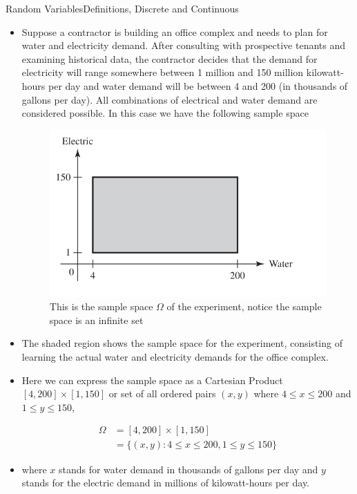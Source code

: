 \documentclass[8pt, usepdftitle=false]{beamer}
\begin{document}
\begin{frame}[allowframebreaks]{Random Variables}{Definitions, Discrete and Continuous}
\begin{itemize}
\item Suppose a contractor is building an office complex and needs to plan for water and electricity demand. After consulting with prospective tenants and examining historical data, the contractor decides that the demand for electricity will range somewhere between 1 million and 150 million kilowatt-hours per day and water demand will be between 4 and 200 (in thousands of gallons per day). All combinations of electrical and water demand are considered possible. In this case we have the following sample space 

\begin{figure}
\includegraphics[scale = .25]{Images/CRV_1.png}
\caption{This is the sample space $\Omega$ of the experiment, notice the sample space is an infinite set}
\end{figure}

\item The shaded region shows the sample space for the experiment, consisting of learning the actual water and electricity demands for the office complex. 

\item Here we can express the sample space as a Cartesian Product $[4, 200] \times [1, 150]$ or set of all ordered pairs $(x, y)$ where $4 \leq x \leq 200$ and $1 \leq y \leq 150$,


\begin{align*}
\Omega &=  [4, 200] \times [1, 150] \\
&=\{(x, y): 4 \leq x \leq 200,1 \leq y \leq 150\}
\end{align*}

\item where $x$ stands for water demand in thousands of gallons per day and $y$ stands for the electric demand in millions of kilowatt-hours per day.


\end{itemize}
\end{frame}
\end{document}
